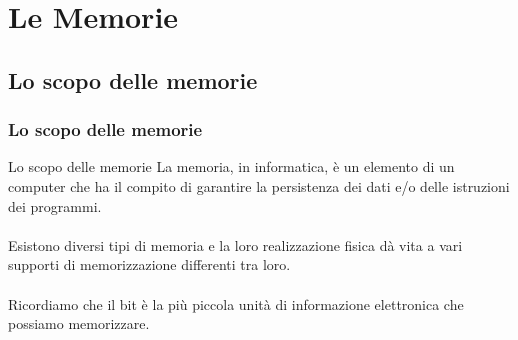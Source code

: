 \section[Le Memorie]{Le Memorie}
\label{sec:memory}


\subsection[Lo scopo delle memorie]{Lo scopo delle memorie}
\begin{frame}
	\frametitle{Lo scopo delle memorie}
	
	\begin{block}{Lo scopo delle memorie}
		La memoria, in informatica, è un elemento di un computer che ha il compito di garantire la persistenza dei dati e/o delle istruzioni dei programmi.\\~\\
		Esistono diversi tipi di memoria e la loro realizzazione fisica dà vita a vari supporti di memorizzazione differenti tra loro.\\~\\
		Ricordiamo che il bit è la più piccola unità di informazione elettronica che possiamo memorizzare.		
		
		
	\end{block}
	
\end{frame}



